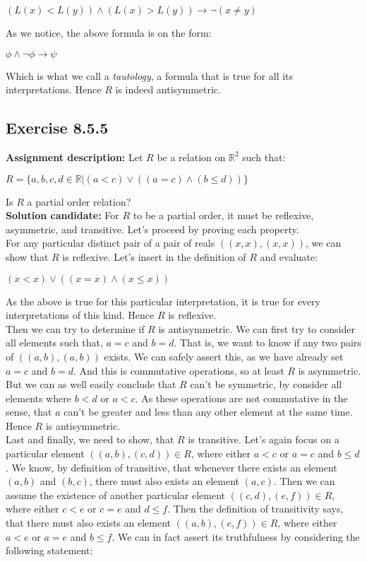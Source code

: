 \documentclass{report}
\newcommand{\cent}[1]{\begin{center}#1\end{center}}
\newcommand{\doubleR}{\mathbb{R}}
\newcommand{\In}{\! \in \!}
\newcommand{\assignmentDescription}{\textbf{Assignment description: }}
\newcommand{\solution}{\textbf{Solution candidate: }}
\newcommand{\QED}{\boxed{}}
\newcommand{\Exercise}[1]{\subsection{Exercise #1}}
\begin{document}
	\cent{$(L(x) < L(y)) \wedge (L(x) > L(y))\to \neg(x \neq y)$}
	
	As we notice, the above formula is on the form:
	
	\cent{$ \phi \wedge \neg \phi\to \psi$}
	
	Which is what we call a  \textit{tautology}, a formula that is true for all its interpretations. Hence $R$ is indeed antisymmetric.\\
	\QED
	
	\Exercise{8.5.5}
	\assignmentDescription
	Let $R$ be a relation on $\doubleR^2$ such that:
	
	\cent{$R = \{ a,b,c,d \In \doubleR | (a < c) \vee ((a = c) \wedge (b \leq d))\}$}
	
	Is $R$ a partial order relation?\\
	
	\solution
	For $R$ to be a partial order, it must be reflexive, asymmetric, and transitive. Let's proceed by proving each property.\\
	
	For any particular distinct pair of a pair of reals $((x,x),(x,x))$, we can show that $R$ is reflexive. Let's insert in the definition of $R$ and evaluate:
	
	\cent{$(x < x) \vee ((x = x) \wedge (x \leq x))$}
	
	As the above is true for this particular interpretation, it is true for every interpretations of this kind. Hence $R$ is reflexive.\\
	
	Then we can try to determine if $R$ is antisymmetric. We can first try to consider all elements such that, $a=c$ and $b = d$. That is, we want to know if any two pairs of  $((a,b),(a,b))$ exists. We can safely assert this, as we have already set $a=c$ and $b=d$. And this is commutative operations, so at least $R$ is asymmetric. But we can as well easily conclude that $R$ can't be symmetric, by consider all elements where $b < d$ or $a< c$. As these operations are not commutative in the sense, that $a$ can't be greater and less than any other element at the same time. Hence $R$ is antisymmetric.\\
	
	Last and finally, we need to show, that $R$ is transitive. Let's again focus on a particular element $((a,b),(c,d)) \In R$, where either $a < c$ or $a = c$ and $b \leq d$. We know, by definition of transitive, that whenever there exists an element $(a,b)$ and $(b,c)$, there must also exists an element $(a,c)$. Then we can assume the existence of another particular element $((c,d),(e,f)) \In R$, where either $c < e$  or $c=e$ and $d \leq f$. Then the definition of transitivity says, that there must also exists an element $((a,b),(e,f)) \In R$, where either $a<e$ or $a=e$ and $b \leq f$. We can in fact assert its truthfulness by considering the following statement:
	
\end{document}
